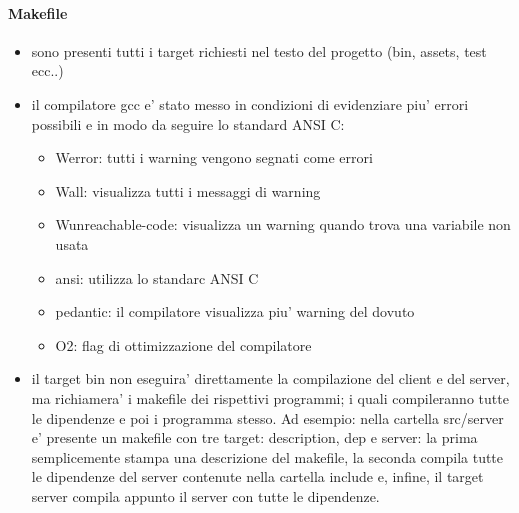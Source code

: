 \documentclass[12pt]{article}
\begin{document}
\paragraph{Makefile}
\begin{itemize}
    \item sono presenti tutti i target richiesti nel testo del progetto (bin, assets, test ecc..)
    \item il compilatore gcc e' stato messo in condizioni di evidenziare piu' errori possibili e in modo da seguire lo standard ANSI C:
    \begin{itemize}
        \item Werror: tutti i warning vengono segnati come errori    
        \item Wall: visualizza tutti i messaggi di warning
        \item Wunreachable-code: visualizza un warning quando trova una variabile non usata
        \item ansi: utilizza lo standarc ANSI C
        \item pedantic: il compilatore visualizza piu' warning del dovuto
        \item O2: flag di ottimizzazione del compilatore
    \end{itemize}
    \item il target bin non eseguira' direttamente la compilazione del client e del server, ma richiamera' i makefile dei rispettivi programmi; i quali compileranno tutte le dipendenze e poi i programma stesso. Ad esempio: nella cartella src/server e' presente un makefile con tre target: description, dep e server: la prima semplicemente stampa una descrizione del makefile, la seconda compila tutte le dipendenze del server contenute nella cartella include e, infine, il target server compila appunto il server con tutte le dipendenze. 
\end{itemize} 
\end{document}
